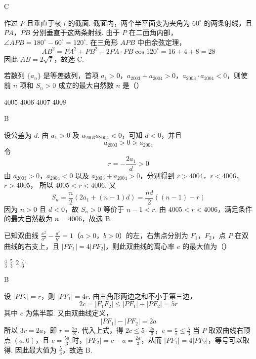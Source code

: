 \begin{answer}
C
\end{answer}

\begin{solution}
作过 \(P\) 且垂直于棱 \(l\) 的截面. 截面内，两个半平面变为夹角为 \(60^{\circ}\) 的两条射线，且 \(PA\)，\(PB\) 分别垂直于这两条射线. 由于 \(P\) 在二面角内部，\(\angle APB=180^{\circ}-60^{\circ}=120^{\circ}\). 在三角形 \(APB\) 中由余弦定理，
\[
AB^2=PA^2+PB^2-2PA\cdot PB\cos120^{\circ}=16+4+8=28\]
因此 \(AB=2\sqrt{7}\)，故选 C.
\end{solution}

\begin{problem}
若数列 \(\{a_n\}\) 是等差数列，首项 \(a_1>0\)，\(a_{2003}+a_{2004}>0\)，\(a_{2003}\cdot a_{2004}<0\)，则使前 \(n\) 项和 \(S_n>0\) 成立的最大自然数 \(n\) 是（\quad）

\choices
    {\(4005\)}
    {\(4006\)}
    {\(4007\)}
    {\(4008\)}
\end{problem}

\begin{answer}
B
\end{answer}

\begin{solution}
设公差为 \(d\). 由 \(a_1>0\) 及 \(a_{2003}a_{2004}<0\)，可知 \(d<0\)，并且
\[
a_{2003}>0>a_{2004}\]
令
\[
r=-\frac{2a_1}{d}>0\]
由 \(a_{2003}>0\)，\(a_{2004}<0\) 以及 \(a_{2003}+a_{2004}>0\)，分别得到
\(r>4004\)，\(r<4006\)，\(r>4005\)，
所以 \(4005<r<4006\). 又
\[
S_n=\frac{n}{2}\left(2a_1+(n-1)d\right)=\frac{nd}{2}\left((n-1)-r\right)\]
因为 \(n>0\) 且 \(d<0\)，故 \(S_n>0\) 等价于 \(n-1<r\). 由 \(4005<r<4006\)，满足条件的最大自然数为 \(n=4006\)，故选 B.
\end{solution}

\begin{problem}
已知双曲线 \(\frac{x^2}{a^2}-\frac{y^2}{b^2}=1\)（\(a>0\)，\(b>0\)）的左，右焦点分别为 \(F_1\)，\(F_2\)，点 \(P\) 在双曲线的右支上，且 \(\left|PF_1\right|=4\left|PF_2\right|\)，则此双曲线的离心率 \(e\) 的最大值为（\quad）

\choices
    {\(\frac{4}{3}\)}
    {\(\frac{5}{3}\)}
    {\(2\)}
    {\(\frac{7}{3}\)}
\end{problem}

\begin{answer}
B
\end{answer}

\begin{solution}
设 \(\left|PF_2\right|=r\)，则 \(\left|PF_1\right|=4r\). 由三角形两边之和不小于第三边，
\[
2c=\left|F_1F_2\right|\leqslant\left|PF_1\right|+\left|PF_2\right|=5r
\]
其中 \(c\) 为焦半距. 又由双曲线定义，
\[
\left|PF_1\right|-\left|PF_2\right|=2a
\]
所以 \(3r=2a\)，即 \(r=\frac{2a}{3}\). 代入上式，得
\(2c\leqslant5\cdot\frac{2a}{3}\)，\(e=\frac{c}{a}\leqslant\frac{5}{3}\)
当 \(P\) 取双曲线右顶点 \((a,0)\)，且 \(c=\frac{5a}{3}\) 时，\(\left|PF_2\right|=c-a=\frac{2a}{3}\)，从而 \(\left|PF_1\right|=4\left|PF_2\right|\)，等号可以取得. 因此最大值为 \(\frac{5}{3}\)，故选 B.
\end{solution}

